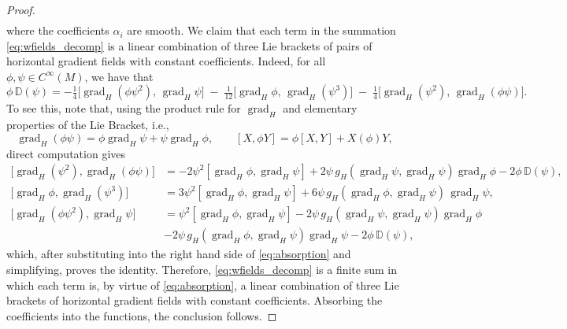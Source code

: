 \documentclass{article}
\theoremstyle{remark}
\newcommand{\M}{M}
\newcommand{\Cinf}{C^{\infty}(\M)}
\DeclareMathOperator{\grad}{\mathrm{grad}}
\begin{document}
\begin{proof}
\begin{align}
\end{align}
%
where the coefficients $\alpha_i$ are smooth. We claim that each term in the summation \eqref{eq:wfields_decomp} is a linear combination of three Lie brackets of pairs of horizontal gradient fields with constant coefficients. Indeed, for all $\phi, \psi \in \Cinf$, we have that
%
\begin{equation}\label{eq:absorption}
\phi\, \mathbb{D}(\psi)
= -\tfrac{1}{4}\bigl[ \grad_H(\phi \psi^{2}),\, \grad_H \psi \bigr]
\;-\; \tfrac{1}{12}\bigl[ \grad_H \phi,\, \grad_H(\psi^{3}) \bigr]
\;-\; \tfrac{1}{4}\bigl[ \grad_H(\psi^{2}),\, \grad_H(\phi \psi) \bigr].
\end{equation}
%
To see this, note that, using the product rule for $\grad_H$ and elementary properties of the Lie Bracket, i.e.,
%
$$\grad_H(\phi \psi) = \phi\grad_H \psi + \psi \grad_H \phi, \qquad [X, \phi Y] = \phi [X, Y] + X(\phi)Y,$$ 
%
direct computation gives
%
\begin{align*}
\bigl[ \grad_H(\psi^{2}), \grad_H(\phi \psi) \bigr]
&= -2\psi^{2} [\grad_H \phi, \grad_H \psi] + 2\psi\,g_H(\grad_H \psi,\grad_H \psi) \grad_H \phi - 2\phi \,\mathbb{D}(\psi),\\
\bigl[ \grad_H \phi, \grad_H(\psi^{3}) \bigr]
&= 3\psi^{2} [\grad_H \phi, \grad_H \psi] + 6\psi\, g_H(\grad_H \phi,\grad_H \psi) \,\grad_H \psi,\\
\bigl[ \grad_H(\phi \psi^{2}), \grad_H \psi \bigr]
&= \psi^{2} [\grad_H \phi, \grad_H \psi] - 2\psi \,g_H(\grad_H \psi,\grad_H \psi)\grad_H \phi\\
&- 2\psi \, g_H(\grad_H \phi,\grad_H \psi)\grad_H \psi - 2\phi\, \mathbb{D}(\psi),
\end{align*}
%
which, after substituting into the right hand side of \eqref{eq:absorption} and simplifying, proves the identity.
%
Therefore, \eqref{eq:wfields_decomp} is a finite sum in which each term is, by virtue of \eqref{eq:absorption}, a linear combination of three Lie brackets of horizontal gradient fields with constant coefficients. Absorbing the coefficients into the functions, the conclusion follows.
\end{proof}
\end{document}
